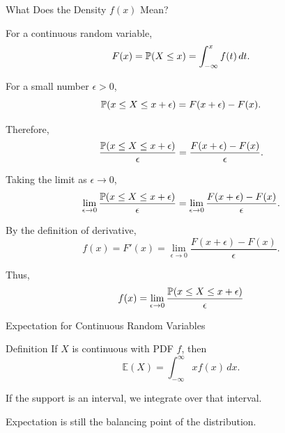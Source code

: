 \begin{frame}{What Does the Density \(f(x)\) Mean?}

For a continuous random variable,
\[
F(x)=\mathbb{P}(X\le x)
=
\int_{-\infty}^x f(t)\,dt.
\]

\vspace{0.2cm}

For a small number \(\epsilon>0\),
\[
\mathbb{P}(x\le X\le x+\epsilon)
=
F(x+\epsilon)-F(x).
\]

Therefore,
\[
\frac{\mathbb{P}(x\le X\le x+\epsilon)}{\epsilon}
=
\frac{F(x+\epsilon)-F(x)}{\epsilon}.
\]

Taking the limit as \(\epsilon\to0\),
\[
\lim_{\epsilon\to0}
\frac{\mathbb{P}(x\le X\le x+\epsilon)}{\epsilon}
=
\lim_{\epsilon\to0}
\frac{F(x+\epsilon)-F(x)}{\epsilon}.
\]

By the definition of derivative,
\[
f(x)=F'(x)
=
\lim_{\epsilon\to0}
\frac{F(x+\epsilon)-F(x)}{\epsilon}.
\]

Thus,
\[
{
f(x)
=
\lim_{\epsilon\to0}
\frac{\mathbb{P}(x\le X\le x+\epsilon)}{\epsilon}
}
\]

\end{frame}













\begin{frame}{Expectation for Continuous Random Variables}
\begin{keybox}{Definition}
If $X$ is continuous with PDF $f$, then
\[
\boxed{
\mathbb{E}(X)=\int_{-\infty}^{\infty} x f(x)\,dx.
}
\]
\end{keybox}

\vspace{0.25cm}

If the support is an interval, we integrate over that interval.

\vspace{0.25cm}

Expectation is still the balancing point of the distribution.
\end{frame}

